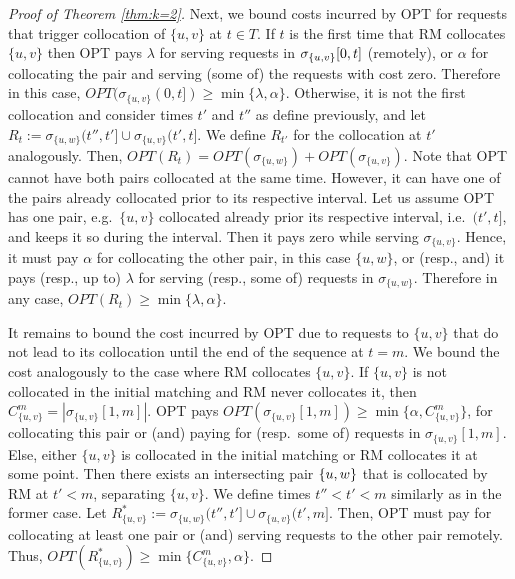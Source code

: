 \documentclass[a4paper,anonymous,USenglish]{lipics-v2019}
\newcommand{\OPT}{\textsc{OPT}\xspace}
\newcommand{\OPTM}{\mathit{OPT}}
\newcommand{\RM}{\textsc{RM}\xspace} %
\DeclarePairedDelimiter\set{\{}{\}}
\begin{document}
\begin{proof}[Proof of Theorem \ref{thm:k=2}]
	Next,
	we bound  costs incurred by \OPT for requests that trigger collocation of $\{u,v\}$ at $t \in T$.
	If $t$ is the first time that \RM collocates $\{u,v\}$ then  \OPT pays
	$\lambda$ for serving requests in $\sigma_{\set{u,v}}[0,t]$ (remotely),
	or $\alpha$ for collocating the pair and
	serving (some of) the requests with  cost zero.
	Therefore in this case,
	$\OPTM (\sigma_{\{u,v\}}(0,t]) \geq  \min{\{ \lambda,\alpha \}}$.
	Otherwise,
	it is not the first collocation and
	consider times $t'$ and $t''$ as define previously,
	 and let 
	$R_t := \sigma_{\{u,w\}}(t'',t'] \cup \sigma_{\{u,v\}}(t',t] $.
	We define $R_{t'}$ for the collocation at $t'$  analogously.
	Then,
	$\OPTM(R_t) = \mathit{OPT} (\sigma_{\{u,w\}}) 
	+ \OPTM(\sigma_{\{u,v\}}) $.
	Note that \OPT cannot have both pairs collocated at the same time.
	However, it can have one of the pairs already collocated prior to its respective interval.
	Let us assume  \OPT has one pair,
	e.g.~$\{u,v\}$ collocated already prior its respective interval, i.e.~$(t',t]$,
	 and keeps it so during the interval.
	 Then it pays zero while serving $\sigma_{\{u,v\}}$.
	Hence,
	it must pay $\alpha$ for collocating the other pair, in this case $\{u,w\}$,
	or (resp., and) it pays (resp., up to) $\lambda$ for serving (resp., some of) requests in $\sigma_{\{u,w\}}$. 
	Therefore in any case,
	$\OPTM(R_t) \geq  \min{\{ \lambda,\alpha \}}$.
	
	It remains to bound the cost  incurred by \OPT due to requests to $\{u,v\}$ that do not lead to its collocation until the end of the sequence at $t=m$.
	We bound the cost analogously to the case where \RM collocates $\{u,v\}$.
	If $\{u,v\}$ is not collocated in the initial matching
	and \RM never collocates it,
	then $ C^{m}_{ \{u,v\} } =| \sigma_{\{u,v\}}[1,m] |$.
	\OPT pays
	$\mathit{OPT} (\sigma_{\{u,v\}}[1,m]) 
	\geq \min{ \{ \alpha, C^{m}_{ \{u,v\} } \} }$,
	for collocating this pair or (and) paying for (resp.~some of) requests in $\sigma_{\{u,v\}}[1,m]$.
	Else,
	either $\{u,v\}$ is collocated in the initial matching
	or \RM collocates it at some point.
	Then there exists an intersecting pair $\set{u,w}$
	that is collocated by \RM at $t' < m$,
	separating $\{u,v\}$.
	We define times $t'' < t' < m$ similarly as in the former case.
	Let $R^*_{\{u,v\}} := \sigma_{\{u,w\}} (t'',t'] \cup \sigma_{\{u,v\}} (t',m]$.
	Then,
	\OPT must pay for collocating at least one pair or (and) serving requests 
	to the other pair remotely.
	Thus,
	$\mathit{OPT} (R^*_{\{u,v\}}) 
	\geq  \min{ \{ C^{m}_{ \{u,v\}}, \alpha \}}$.
	

\end{proof}
\end{document}
